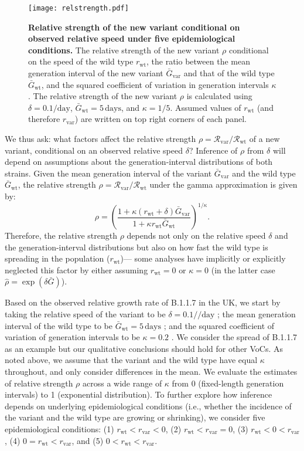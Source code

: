 \documentclass[12pt]{article}
\newcommand{\vvvar}{\mathrm{var}}
\newcommand{\wwwt}{\mathrm{wt}}
\newcommand{\rx}[1]{\ensuremath{{r}_{#1}}\xspace}
\newcommand{\rw}{\rx{\wwwt}}
\newcommand{\rv}{\rx{\vvvar}}
\newcommand{\Rx}[1]{\ensuremath{{\mathcal R}_{#1}}\xspace}
\newcommand{\Rw}{\Rx{\wwwt}}
\newcommand{\Rv}{\Rx{\vvvar}}
\newcommand{\days}{\ensuremath{\, \textrm{days}}}
\newcommand{\pday}{\ensuremath{/\textrm{day}}}
\newcommand{\Gx}[1]{\ensuremath{{\bar G}_{#1}}\xspace}
\newcommand{\Gw}{\Gx{\wwwt}}
\newcommand{\Gv}{\Gx{\vvvar}}
\begin{document}
\begin{figure}[!t]
\texttt{[image: relstrength.pdf]}
\caption{
\textbf{Relative strength of the new variant conditional on observed relative speed under five epidemiological conditions.}
The relative strength of the new variant $\rho$ conditional on the speed of the wild type $\rw$, the ratio between the mean generation interval of the new variant $\Gv$ and that of the wild type $\Gw$, and the squared coefficient of variation in generation intervals $\kappa$.
The relative strength of the new variant $\rho$ is calculated using $\delta=0.1\pday$, $\Gw = 5\days$, and $\kappa = 1/5$.
Assumed values of $\rw$ (and therefore $\rv$) are written on top right corners of each panel.
}
\label{fig:relstrength}
\end{figure}

We thus ask: what factors affect the relative strength $\rho = \Rv/\Rw$ of a new variant, conditional on an observed relative speed $\delta$?
Inference of $\rho$ from $\delta$ will depend on assumptions about the generation-interval distributions of both strains.
Given the mean generation interval of the variant $\Gv$ and the wild type $\Gw$, the relative strength $\rho = \Rv/\Rw$ under the gamma approximation \citep{park2019practical} is given by:
\begin{equation}
\rho = \left(\frac{1 + \kappa (\rw + \delta) \Gv}{1 + \kappa \rw \Gw}\right)^{1/\kappa}.
\end{equation}
Therefore, the relative strength $\rho$ depends not only on the relative speed $\delta$ and the generation-interval distributions but also on how fast the wild type is spreading in the population (\rw)---
some analyses have implicitly or explicitly neglected this factor by either assuming $\rw = 0$ \citep{switzerland2021variant} or $\kappa = 0$ \citep{davies2021estimated} (in the latter case $\hat{\rho} = \exp(\delta \bar{G})$).

Based on the observed relative growth rate of B.1.1.7 in the UK, we start by  taking the relative speed of the variant to be $\delta = 0.1/\pday$  \citep{davies2021estimated}; the mean generation interval of the wild type to be $\Gw = 5\days$ \citep{ferretti2020quantifying}; and the squared coefficient of variation of generation intervals to be $\kappa=0.2$ \citep{ferretti2020quantifying}.
We consider the spread of B.1.1.7 as an example but our qualitative conclusions should hold for other VoCs.
As noted above, we assume that the variant and the wild type have equal $\kappa$ throughout, and only consider differences in the mean.
We evaluate the estimates of relative strength $\rho$ across a wide range of $\kappa$ from 0 (fixed-length generation intervals) to 1 (exponential distribution).
To further explore how inference depends on underlying epidemiological conditions (i.e., whether the incidence of the variant and the wild type are growing or shrinking), we consider five epidemiological conditions: (1) $\rw < \rv < 0$, (2) $\rw < \rv = 0$, (3) $\rw < 0 < \rv$, (4) $0 = \rw < \rv$, and (5) $0 < \rw < \rv$.
\end{document}
